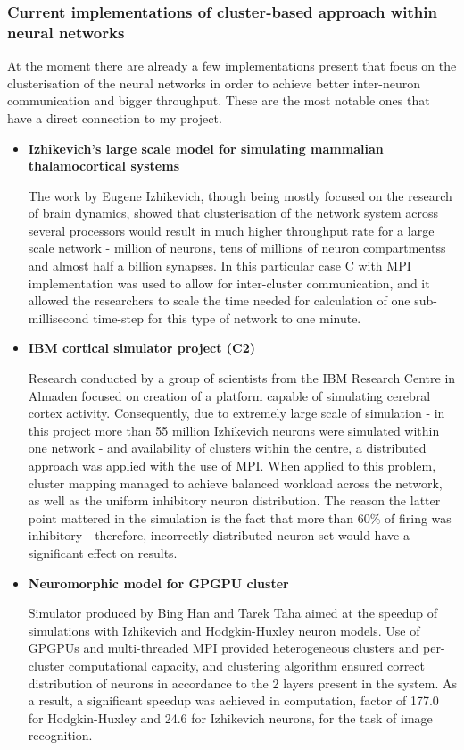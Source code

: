 \subsubsection{Current implementations of cluster-based approach within neural networks}
At the moment there are already a few implementations present that focus on the clusterisation of the neural networks in order to achieve better inter-neuron communication and bigger throughput. 
These are the most notable ones that have a direct connection to my project.

\begin{itemize}
\item{\textbf{Izhikevich's large scale model for simulating mammalian thalamocortical systems}}

The work by Eugene Izhikevich\cite{EugeneM.Izhikevich2008}, though being mostly focused on the research of brain dynamics, showed that clusterisation of the network system across several processors would result in much higher throughput rate for a large scale network - million of neurons, tens of millions of neuron compartmentss and almost half a billion synapses. In this particular case C with MPI implementation was used to allow for inter-cluster communication, and it allowed the researchers to scale the time needed for calculation of one sub-millisecond time-step for this type of network to one minute.

\item{\textbf{IBM cortical simulator project (C2)}}

Research conducted by a group of scientists from the IBM Research Centre in Almaden\cite{DharmendraS.Modha2007} focused on creation of a platform capable of simulating cerebral cortex activity. Consequently, due to extremely large scale of simulation - in this project more than 55 million Izhikevich neurons were simulated within one network - and availability of clusters within the centre, a distributed approach was applied with the use of MPI. When applied to this problem, cluster mapping managed to achieve balanced workload across the network, as well as the uniform inhibitory neuron distribution. The reason the latter point mattered in the simulation is the fact that more than 60\% of firing was inhibitory - therefore, incorrectly distributed neuron set would have a significant effect on results.

\item{\textbf{Neuromorphic model for GPGPU cluster}}

Simulator produced by Bing Han and Tarek Taha aimed at the speedup of simulations with Izhikevich and Hodgkin-Huxley neuron models\cite{TarekM.Taha2010}. Use of GPGPUs and multi-threaded MPI provided heterogeneous  clusters and per-cluster computational capacity, and clustering algorithm ensured correct distribution of neurons in accordance to the 2 layers present in the system. As a result, a significant speedup was achieved in computation, factor of 177.0 for Hodgkin-Huxley and 24.6 for Izhikevich neurons, for the task of image recognition.
\end{itemize}
